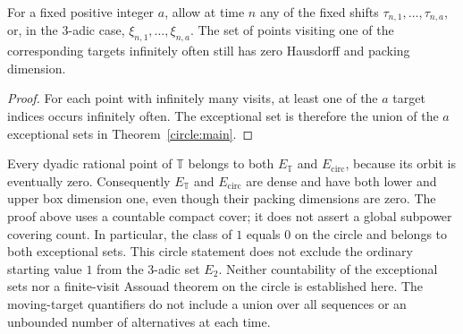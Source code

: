 \begin{corollary}
\label{circle:cor:finite-targets}
For a fixed positive integer $a$, allow at time $n$ any of the
fixed shifts $\tau_{n,1},\ldots,\tau_{n,a}$, or, in the $3$-adic
case, $\xi_{n,1},\ldots,\xi_{n,a}$. The set of points visiting
one of the corresponding targets infinitely often still has zero
Hausdorff and packing dimension.
\end{corollary}
\begin{proof}
For each point with infinitely many visits, at least one of the
$a$ target indices occurs infinitely often. The exceptional set is
therefore the union of the $a$ exceptional sets in
Theorem~\ref{circle:main}.
\end{proof}

\begin{remark}
Every dyadic rational point of $\mathbb T$ belongs to both
$E_{\mathbb T}$ and $E_{\mathrm{circ}}$,
because its orbit is eventually zero. Consequently $E_{\mathbb T}$
and $E_{\mathrm{circ}}$ are dense and have both lower and upper box
dimension one, even though their packing dimensions are zero.
The proof above uses a countable
compact cover; it does not assert a global subpower covering count.
In particular, the class of $1$ equals $0$ on the circle and belongs
to both exceptional sets. This circle statement does not exclude the
ordinary starting value $1$ from the $3$-adic set $E_2$.
Neither countability of the exceptional sets nor a finite-visit
Assouad theorem on the circle is established here. The moving-target
quantifiers do not include a union over all sequences or an unbounded
number of alternatives at each time.
\end{remark}

